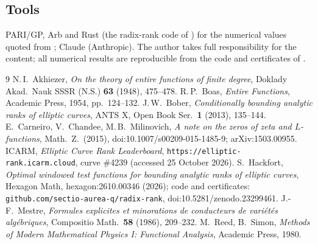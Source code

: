 \documentclass[11pt]{amsart}
\theoremstyle{definition}
\theoremstyle{remark}
\begin{document}
\subsection*{Tools}
PARI/GP, Arb and Rust (the radix-rank code of \cite{Hac}) for the numerical values quoted from \cite{Hac}; Claude (Anthropic).
The author takes full responsibility for the content; all numerical results are reproducible from the code and
certificates of \cite{Hac}.

\begin{thebibliography}{9}
 N.\,I.~Akhiezer, \emph{On the theory of entire functions of finite degree}, Doklady Akad.\ Nauk SSSR (N.S.) \textbf{63} (1948), 475--478.
 R.\,P.~Boas, \emph{Entire Functions}, Academic Press, 1954, pp.~124--132.
 J.\,W.~Bober, \emph{Conditionally bounding analytic ranks of elliptic curves}, ANTS X, Open Book Ser.\ \textbf{1} (2013), 135--144.
 E.~Carneiro, V.~Chandee, M.\,B.~Milinovich, \emph{A note on the zeros of zeta and $L$-functions}, Math.\ Z.\ (2015), doi:10.1007/s00209-015-1485-9; arXiv:1503.00955.
 ICARM, \emph{Elliptic Curve Rank Leaderboard}, \texttt{https://elliptic-rank.icarm.cloud}, curve \#4239 (accessed 25 October 2026).
 S.~Hackfort, \emph{Optimal windowed test functions for bounding analytic ranks of elliptic curves}, Hexagon Math, hexagon:2610.00346 (2026); code and certificates: \texttt{github.com/sectio-aurea-q/radix-rank}, doi:10.5281/zenodo.23299461.
 J.-F.~Mestre, \emph{Formules explicites et minorations de conducteurs de vari\'et\'es alg\'ebriques}, Compositio Math.\ \textbf{58} (1986), 209--232.
 M.~Reed, B.~Simon, \emph{Methods of Modern Mathematical Physics I: Functional Analysis}, Academic Press, 1980.
\end{thebibliography}
\end{document}
